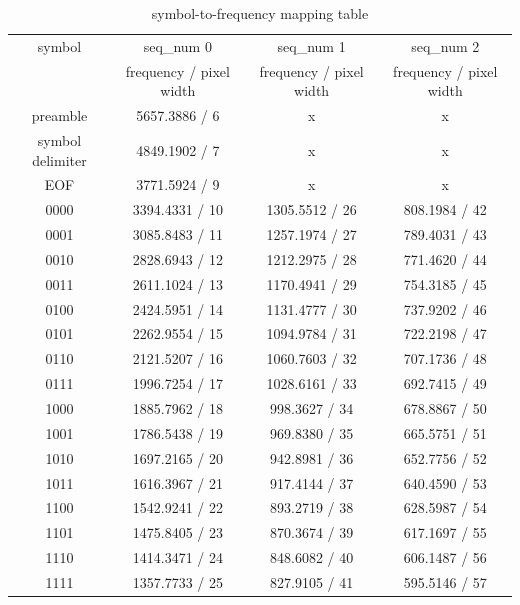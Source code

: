 \begin{table}[!htb]
\centering
\caption{symbol-to-frequency mapping table}
        \begin{tabular}{c|c|c|c}
        \hline symbol & seq\_num 0 & seq\_num 1 & seq\_num 2 \\ 
    ~     & frequency / pixel width  & frequency / pixel width & frequency / pixel width \\
  \hline \hline 
  preamble & 5657.3886 / 6& x & x \\ \hline
  symbol delimiter & 4849.1902 / 7 & x & x \\ \hline  
  EOF & 3771.5924 / 9& x & x \\ \hline 
  0000 & 3394.4331 / 10& 1305.5512 / 26& 808.1984 / 42\\ \hline 
  0001 & 3085.8483 / 11& 1257.1974 / 27& 789.4031 / 43\\ \hline 
  0010 & 2828.6943 / 12& 1212.2975 / 28& 771.4620 / 44\\ \hline 
  0011 & 2611.1024 / 13& 1170.4941 / 29& 754.3185 / 45\\ \hline 
  0100 & 2424.5951 / 14& 1131.4777 / 30& 737.9202 / 46\\ \hline 
  0101 & 2262.9554 / 15& 1094.9784 / 31& 722.2198 / 47\\ \hline 
  0110 & 2121.5207 / 16& 1060.7603 / 32& 707.1736 / 48\\ \hline 
  0111 & 1996.7254 / 17& 1028.6161 / 33& 692.7415 / 49\\ \hline 
  1000 & 1885.7962 / 18& 998.3627 / 34& 678.8867 / 50\\ \hline 
  1001 & 1786.5438 / 19& 969.8380 / 35& 665.5751 / 51\\ \hline 
  1010 & 1697.2165 / 20& 942.8981 / 36& 652.7756 / 52\\ \hline 
  1011 & 1616.3967 / 21& 917.4144 / 37& 640.4590 / 53\\ \hline 
  1100 & 1542.9241 / 22& 893.2719 / 38& 628.5987 / 54\\ \hline 
  1101 & 1475.8405 / 23& 870.3674 / 39& 617.1697 / 55\\ \hline 
  1110 & 1414.3471 / 24& 848.6082 / 40& 606.1487 / 56\\ \hline 
  1111 & 1357.7733 / 25& 827.9105 / 41& 595.5146 / 57\\ \hline
        \end{tabular}
        \label{tab:symbol}
\end{table}

